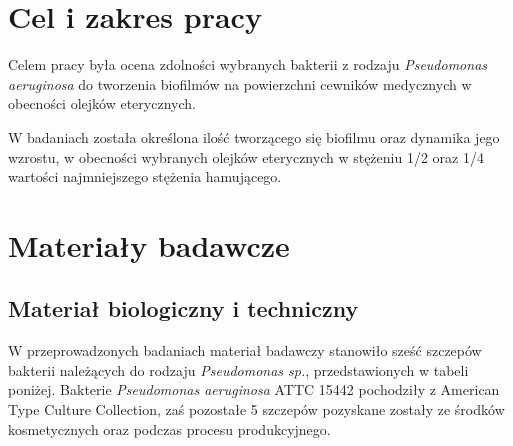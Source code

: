 \documentclass[11pt,a4paper]{report}
\begin{document}









\chapter{Cel i zakres pracy}


Celem pracy była ocena zdolności wybranych bakterii z rodzaju \textit{Pseudomonas aeruginosa} do tworzenia biofilmów na powierzchni cewników medycznych w obecności olejków eterycznych.


W badaniach została określona ilość tworzącego się biofilmu oraz dynamika jego wzrostu, w obecności wybranych olejków eterycznych w stężeniu 1/2 oraz 1/4 wartości najmniejszego stężenia hamującego.


\chapter{Materiały badawcze}

\section{Materiał biologiczny i techniczny}

W przeprowadzonych badaniach materiał badawczy stanowiło sześć szczepów bakterii należących do rodzaju \textit{Pseudomonas sp.}, przedstawionych w tabeli poniżej.
Bakterie \textit{Pseudomonas aeruginosa} ATTC 15442 pochodziły z American Type Culture Collection, zaś pozostałe 5 szczepów pozyskane zostały ze środków kosmetycznych oraz podczas procesu produkcyjnego.\
\end{document}
